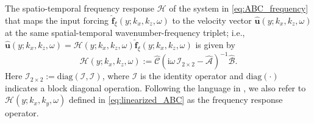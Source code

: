 The spatio-temporal frequency response $\mathcal{H}$ of the system in  \eqref{eq:ABC_frequency} that maps the input forcing $\boldsymbol{\widehat{f}}_{\xi}(y;k_x,k_z,\omega)$ to the velocity vector $\boldsymbol{\widehat{u}}(y;k_x,k_z,\omega)$  at the same spatial-temporal wavenumber-frequency triplet; i.e., $\boldsymbol{\widehat{u}}(y;k_x,k_z,\omega)=\mathcal{H}(y;k_x,k_z,\omega)\boldsymbol{\widehat{f}}_{\xi}(y;k_x,k_z,\omega)$ is given by 
\begin{equation}
    \mathcal{H}(y;k_x,k_z,\omega):=\widehat{\mathcal{C}}\left(\text{i}\omega\,\mathcal{I}_{2\times 2}-\widehat{\mathcal{A}}\right)^{-1}\widehat{\mathcal{B}}.
     \label{eq:linearized_ABC}
\end{equation}
Here $\mathcal{I}_{2\times 2}:=\text{diag}(\mathcal{I},\mathcal{I})$, where $\mathcal{I}$ is the identity operator and $\text{diag}(\cdot)$ indicates a block diagonal operation. Following the language in \citet{jovanovic2020bypass}, we also refer to $\mathcal{H}(y; k_x,k_y, \omega)$ defined in \eqref{eq:linearized_ABC} as the frequency response operator. 


